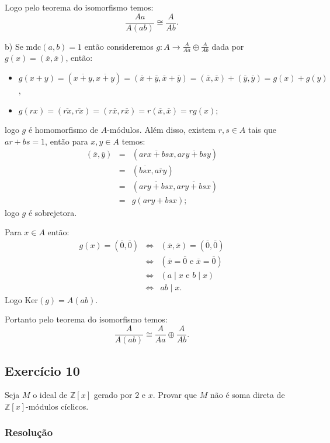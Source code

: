 \documentclass[10pt,a4paper]{article}
\begin{document}
\medskip
\noindent
Logo pelo teorema do isomorfismo temos:
\[
\frac{Aa}{A(ab)}\cong\frac{A}{Ab}.
\]

\medskip
\noindent
b) Se $\mathrm{mdc}(a,b)=1$ então consideremos $g:A\rightarrow\frac{A}{Aa}\oplus\frac{A}{Ab}$ dada por $g(x)=(\overline{x},\overline{x})$, então:
\begin{itemize}
\item $g(x+y)=(\overline{x+y},\overline{x+y})=(\overline{x}+\overline{y},\overline{x}+\overline{y})=(\overline{x},\overline{x})+(\overline{y},\overline{y})=g(x)+g(y)$,
\item $g(rx)=(\overline{rx},\overline{rx})=(r\overline{x},r\overline{x})=r(\overline{x},\overline{x})=rg(x)$;
\end{itemize}
logo $g$ é homomorfismo de $A$-módulos. Além disso, existem $r,s\in A$ tais que $ar+bs=1$, então para $x,y\in A$ temos:
\[
\begin{array}{rcl}
(\overline{x},\overline{y})&=&(\overline{arx+bsx},\overline{ary+bsy})\\&=&(\overline{bsx},\overline{ary})\\&=&(\overline{ary+bsx},\overline{ary+bsx})\\&=&g(ary+bsx);
\end{array}
\]
logo $g$ é sobrejetora.

\medskip
\noindent
Para $x\in A$ então:
\[
\begin{array}{rcl}
g(x)=(\overline{0},\overline{0})&\Leftrightarrow&(\overline{x},\overline{x})=(\overline{0},\overline{0})\\&\Leftrightarrow&(\overline{x}=\overline{0}\text{ e }\overline{x}=\overline{0})\\&\Leftrightarrow&(a\mid x\text{ e }b\mid x)\\&\Leftrightarrow&ab\mid x.
\end{array}
\]
Logo $\mathrm{Ker}(g)=A(ab)$.

\medskip
\noindent
Portanto pelo teorema do isomorfismo temos:
\[
\frac{A}{A(ab)}\cong\frac{A}{Aa}\oplus\frac{A}{Ab}.
\]

\subsection*{Exercício 10}

Seja $M$ o ideal de $\mathbb{Z}[x]$ gerado por $2$ e $x$. Provar que $M$ não é soma direta de $\mathbb{Z}[x]$-módulos cíclicos.

\subsubsection*{Resolução}
\end{document}
